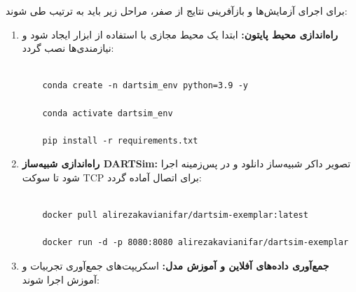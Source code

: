 \documentclass[oneside,openany,a4paper,12pt]{article}
\begin{document}
برای اجرای آزمایش‌ها و بازآفرینی نتایج از صفر، مراحل زیر باید به ترتیب طی شوند:
\begin{enumerate}

    \item \textbf{راه‌اندازی محیط پایتون:} ابتدا یک محیط مجازی با استفاده از ابزار  ایجاد شود و نیازمندی‌ها نصب گردد:

    \begin{singlespace}

    \begin{latin}

    \begin{verbatim}

    conda create -n dartsim_env python=3.9 -y

    conda activate dartsim_env

    pip install -r requirements.txt

    \end{verbatim}

    \end{latin}

    \end{singlespace}

    

    \item \textbf{راه‌اندازی شبیه‌ساز DARTSim:} تصویر داکر شبیه‌ساز دانلود و در پس‌زمینه اجرا شود تا سوکت TCP برای اتصال آماده گردد:

    \begin{singlespace}

    \begin{latin}

    \begin{verbatim}

    docker pull alirezakavianifar/dartsim-exemplar:latest

    docker run -d -p 8080:8080 alirezakavianifar/dartsim-exemplar

    \end{verbatim}

    \end{latin}

    \end{singlespace}

    

    \item \textbf{جمع‌آوری داده‌های آفلاین و آموزش مدل:} اسکریپت‌های جمع‌آوری تجربیات و آموزش اجرا شوند:

    \begin{singlespace}


\end{singlespace}
\end{enumerate}
\end{document}

